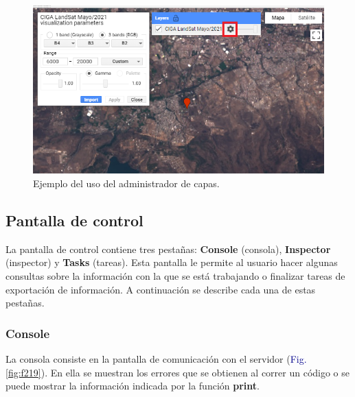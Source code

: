 \documentclass[
  12pt,
  letterpaper,
  twoside]{book}
\newcommand\boldpurple[1]{\textcolor{darkpurple}{\textbf{#1}}}
\begin{document}
\begin{figure}[H]

{\centering \includegraphics[width=0.95\linewidth]{Img/layer} 

}

\caption{Ejemplo del uso del administrador de capas.}\label{fig:f218}
\end{figure}

\hypertarget{pantalla-de-control}{%
\subsection*{Pantalla de control}\label{pantalla-de-control}}

La pantalla de control contiene tres pestañas: \textbf{Console} (consola), \textbf{Inspector} (inspector) y \textbf{Tasks} (tareas). Esta pantalla le permite al usuario hacer algunas consultas sobre la información con la que se está trabajando o finalizar tareas de exportación de información. A continuación se describe cada una de estas pestañas.

\hypertarget{console}{%
\subsubsection*{Console}\label{console}}

La consola consiste en la pantalla de comunicación con el servidor (\textcolor{darkblue}{Fig.} \ref{fig:f219}). En ella se muestran los errores que se obtienen al correr un código o se puede mostrar la información indicada por la función \boldpurple{print}.
\end{document}
